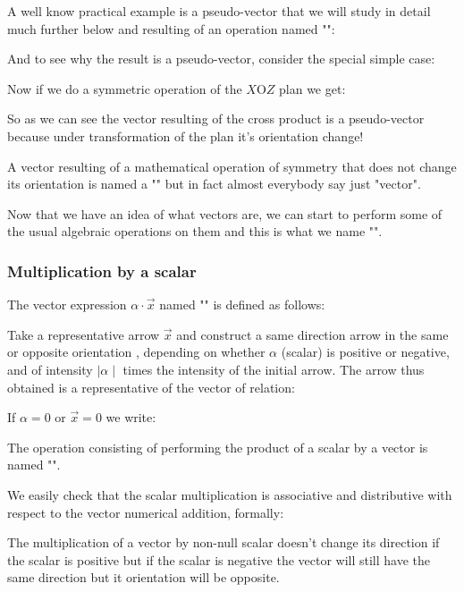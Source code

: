 A well know practical example is a pseudo-vector that we will study in detail much further below and resulting of an operation named "":
	
And to see why the result is a pseudo-vector, consider the special simple case:
	
Now if we do a symmetric operation of the $X\text{O}Z$ plan we get:
	
So as we can see the vector resulting of the cross product is a pseudo-vector because under transformation of the plan it's orientation change!

A vector resulting of a mathematical operation of symmetry that does not change its orientation is named a "" but in fact almost everybody say just "vector".

Now that we have an idea of what vectors are, we can start to perform some of the usual algebraic operations on them and this is what we name "".

\pagebreak
\subsubsection{Multiplication by a scalar}

The vector expression $\alpha\cdot \vec{x}$ named "" is defined as follows:

Take a representative arrow $\vec{x}$ and construct a same direction arrow in the same or opposite orientation , depending on whether $\alpha$ (scalar) is positive or negative, and of intensity $\mid \alpha \mid$ times the intensity of the initial arrow. The arrow thus obtained is a representative of the vector of relation:
	
If $\alpha=0$ or $\vec{x}=0$ we write:
	
The operation consisting of performing the product of a scalar by a vector is named "".

We easily check that the scalar multiplication is associative and distributive with respect to the vector numerical addition, formally:
	

	The multiplication of a vector by non-null scalar doesn't change its direction if the scalar is positive but if the scalar is negative the vector will still have the same direction but it orientation will be opposite.
	
